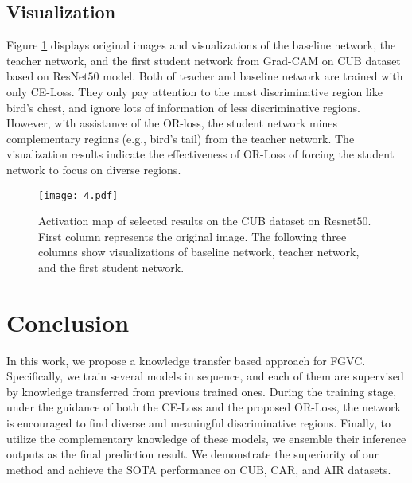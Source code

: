 \documentclass{article}
\begin{document}
  






\subsection{Visualization}
Figure \ref{fig:photo4} displays original images and visualizations of the baseline network, the teacher network, and the first student network from Grad-CAM on CUB dataset based on ResNet$50$ model. Both of teacher and baseline network are trained with only CE-Loss. They only pay attention to the most discriminative region like bird's chest, and ignore lots of information of less discriminative regions. However, with assistance of the OR-loss, the student network mines complementary regions (e.g., bird's tail) from the teacher network. The visualization results indicate the effectiveness of OR-Loss of forcing the student network to focus on diverse regions.

\begin{figure}[!t]
\centering
\texttt{[image: 4.pdf]}
\caption{Activation map of selected results on the CUB dataset on Resnet$50$. First column represents the original image. The following three columns show visualizations of baseline network, teacher network, and the first student network.}
\label{fig:photo4}
\end{figure}


\section{Conclusion}



In this work, we propose a knowledge transfer based approach for FGVC. Specifically, we train several models in sequence, and each of them are supervised by knowledge transferred from previous trained ones. During the training stage, under the guidance of both the CE-Loss and the proposed OR-Loss, the network is encouraged to find diverse and meaningful discriminative regions. Finally, to utilize the complementary knowledge of these models, we ensemble their inference outputs as the final prediction result. We demonstrate the superiority of our method and achieve the SOTA performance on CUB, CAR, and 
AIR datasets.


\end{document}
